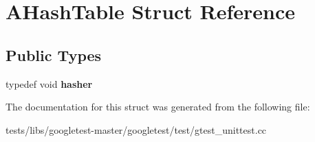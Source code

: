 \hypertarget{structAHashTable}{}\section{A\+Hash\+Table Struct Reference}
\label{structAHashTable}
\subsection*{Public Types}
\begin{DoxyCompactItemize}
\item 
\mbox{\label{structAHashTable_af0df4ce57a783be396e80cb8df6b6259}} 
typedef void {\bfseries hasher}
\end{DoxyCompactItemize}


The documentation for this struct was generated from the following file\+:\begin{DoxyCompactItemize}
\item 
tests/libs/googletest-\/master/googletest/test/gtest\+\_\+unittest.\+cc\end{DoxyCompactItemize}
